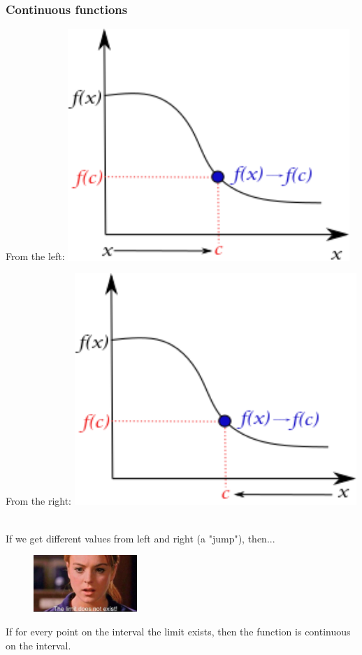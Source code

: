 \documentclass{if-beamer}
\begin{document}
\begin{frame}
\frametitle{Continuous functions}
\begin{minipage}{0.5\textwidth}
	From the left:
	\centering
	\includegraphics[width = 0.8\textwidth]{figures/left}
\end{minipage}
\begin{minipage}{0.5\textwidth}
	From the right:
	\centering
	\includegraphics[width = 0.8\textwidth]{figures/right}
\end{minipage}
\\\vspace{10pt}
If we get different values from left and right (a "jump"), then...
\begin{figure}
	\centering
	\includegraphics[width = 0.35\textwidth]{figures/limitdne}
\end{figure} 

If for every point on the interval the limit exists, then the function is continuous on the interval.
\end{frame}
\end{document}
